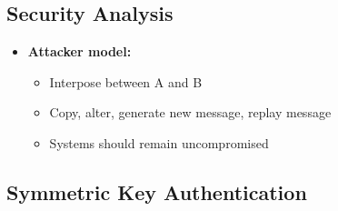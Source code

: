\documentclass[parskip=half]{scrartcl}
\begin{document}

    \subsection{Security Analysis} %
    \label{sec:security_analysis}
    
        \begin{itemize}
            \item 
            \textbf{Attacker model:}
            \begin{itemize}
                \item 
                Interpose between A and B
                \item 
                Copy, alter, generate new message, replay message
                \item 
                Systems should remain uncompromised 
            \end{itemize}
        \end{itemize}


    \subsection{Symmetric Key Authentication} %
    \label{sub:symmetric_key_authentication}
    
\end{document}
